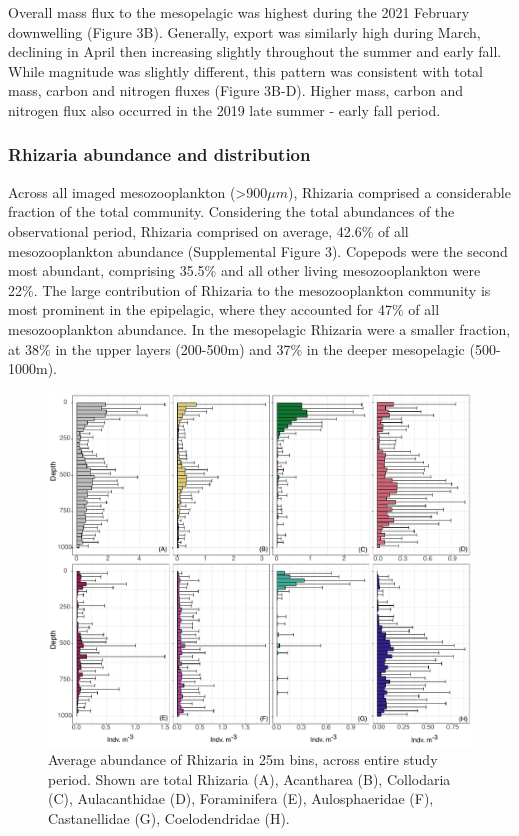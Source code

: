 \documentclass[
]{article}
\begin{document}
Overall mass flux to the mesopelagic was highest during the 2021
February downwelling (Figure 3B). Generally, export was similarly high
during March, declining in April then increasing slightly throughout the
summer and early fall. While magnitude was slightly different, this
pattern was consistent with total mass, carbon and nitrogen fluxes
(Figure 3B-D). Higher mass, carbon and nitrogen flux also occurred in
the 2019 late summer - early fall period.

\subsubsection{Rhizaria abundance and
distribution}\label{rhizaria-abundance-and-distribution}

Across all imaged mesozooplankton (\textgreater900\(\mu m\)), Rhizaria
comprised a considerable fraction of the total community. Considering
the total abundances of the observational period, Rhizaria comprised on
average, 42.6\% of all mesozooplankton abundance (Supplemental Figure
3). Copepods were the second most abundant, comprising 35.5\% and all
other living mesozooplankton were 22\%. The large contribution of
Rhizaria to the mesozooplankton community is most prominent in the
epipelagic, where they accounted for 47\% of all mesozooplankton
abundance. In the mesopelagic Rhizaria were a smaller fraction, at 38\%
in the upper layers (200-500m) and 37\% in the deeper mesopelagic
(500-1000m).

\begin{figure}[H]

{\centering \includegraphics{images/04_vertical.pdf}

}

\caption{Average abundance of Rhizaria in 25m bins, across entire study
period. Shown are total Rhizaria (A), Acantharea (B), Collodaria (C),
Aulacanthidae (D), Foraminifera (E), Aulosphaeridae (F), Castanellidae
(G), Coelodendridae (H).}

\end{figure}%
\end{document}
